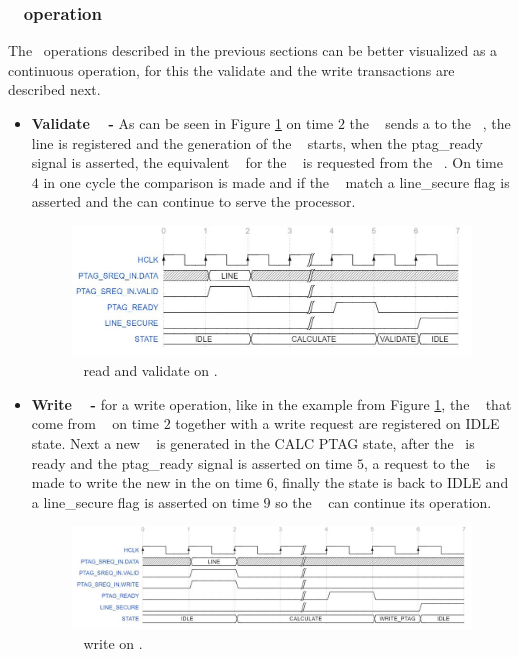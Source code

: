 \subsubsection{\seceng~ operation }
The\seceng~ operations described in the previous sections can be better visualized as a continuous operation, for this the validate and the write transactions are described next.
\begin{itemize}
 \item{\textbf{Validate \ptag~ - }} As can be seen in Figure \ref{fig:ptgag_rd_no_mt}  on time $2$ the \handler~ sends a  \sline to the \seceng~, the line is registered and the generation of the \ptag~ starts, when the ptag\_ready signal is asserted,  the equivalent \ptag~ for the \sline~ is requested from the \ptagmem~. On time $4$ in one cycle the comparison is made and if the \ptags~ match a line\_secure flag is asserted and the \handler can continue to serve the processor.
 
   \begin{figure}[!ht]
    \centering
    \includegraphics[width=\textwidth]{figures/others/ptag_read_sec_eng.JPG}
    \caption{\ptag~ read and validate on \seceng.}
    \label{fig:ptgag_rd_no_mt}
\end{figure}


 \item{\textbf{Write \ptag~ - }} for a write operation, like in the example from  Figure \ref{fig:ptgag_rd_no_mt}, the \sline~ that  come from \handler~  on time $2$ together with a write request are registered on IDLE state.  Next a new \ptag~ is generated in the CALC PTAG state, after the \ptag~is ready and the ptag\_ready signal is asserted on time $5$, a request to the \pmmu~ is made  to write the new \ptag in the \ptagmem on time $6$, finally the state is back to IDLE  and a line\_secure flag is asserted on time $9$ so the \handler~ can continue its operation. 
   \begin{figure}[!ht]
    \centering
    \includegraphics[width=\textwidth]{figures/others/ptag_write_sec_eng.JPG}
    \caption{\ptag~ write  on \seceng.}
    \label{fig:se_pw_no_mt}
\end{figure}
\end{itemize}

